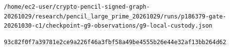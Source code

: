 \documentclass[10pt]{article}
\begin{document}
\texttt{\small /\allowbreak{}h\allowbreak{}o\allowbreak{}m\allowbreak{}e\allowbreak{}/\allowbreak{}e\allowbreak{}c\allowbreak{}2\allowbreak{}-\allowbreak{}u\allowbreak{}s\allowbreak{}e\allowbreak{}r\allowbreak{}/\allowbreak{}c\allowbreak{}r\allowbreak{}y\allowbreak{}p\allowbreak{}t\allowbreak{}o\allowbreak{}-\allowbreak{}p\allowbreak{}e\allowbreak{}n\allowbreak{}c\allowbreak{}i\allowbreak{}l\allowbreak{}-\allowbreak{}s\allowbreak{}i\allowbreak{}g\allowbreak{}n\allowbreak{}e\allowbreak{}d\allowbreak{}-\allowbreak{}g\allowbreak{}r\allowbreak{}a\allowbreak{}p\allowbreak{}h\allowbreak{}-\allowbreak{}2\allowbreak{}0\allowbreak{}2\allowbreak{}6\allowbreak{}1\allowbreak{}0\allowbreak{}2\allowbreak{}9\allowbreak{}/\allowbreak{}r\allowbreak{}e\allowbreak{}s\allowbreak{}e\allowbreak{}a\allowbreak{}r\allowbreak{}c\allowbreak{}h\allowbreak{}/\allowbreak{}p\allowbreak{}e\allowbreak{}n\allowbreak{}c\allowbreak{}i\allowbreak{}l\allowbreak{}\_\allowbreak{}l\allowbreak{}a\allowbreak{}r\allowbreak{}g\allowbreak{}e\allowbreak{}\_\allowbreak{}p\allowbreak{}r\allowbreak{}i\allowbreak{}m\allowbreak{}e\allowbreak{}\_\allowbreak{}2\allowbreak{}0\allowbreak{}2\allowbreak{}6\allowbreak{}1\allowbreak{}0\allowbreak{}2\allowbreak{}9\allowbreak{}/\allowbreak{}r\allowbreak{}u\allowbreak{}n\allowbreak{}s\allowbreak{}/\allowbreak{}p\allowbreak{}1\allowbreak{}8\allowbreak{}6\allowbreak{}3\allowbreak{}7\allowbreak{}9\allowbreak{}-\allowbreak{}g\allowbreak{}a\allowbreak{}t\allowbreak{}e\allowbreak{}-\allowbreak{}2\allowbreak{}0\allowbreak{}2\allowbreak{}6\allowbreak{}1\allowbreak{}0\allowbreak{}3\allowbreak{}0\allowbreak{}-\allowbreak{}c\allowbreak{}1\allowbreak{}/\allowbreak{}c\allowbreak{}h\allowbreak{}e\allowbreak{}c\allowbreak{}k\allowbreak{}p\allowbreak{}o\allowbreak{}i\allowbreak{}n\allowbreak{}t\allowbreak{}-\allowbreak{}g\allowbreak{}9\allowbreak{}-\allowbreak{}o\allowbreak{}b\allowbreak{}s\allowbreak{}e\allowbreak{}r\allowbreak{}v\allowbreak{}a\allowbreak{}t\allowbreak{}i\allowbreak{}o\allowbreak{}n\allowbreak{}s\allowbreak{}/\allowbreak{}g\allowbreak{}9\allowbreak{}-\allowbreak{}l\allowbreak{}o\allowbreak{}c\allowbreak{}a\allowbreak{}l\allowbreak{}-\allowbreak{}c\allowbreak{}u\allowbreak{}s\allowbreak{}t\allowbreak{}o\allowbreak{}d\allowbreak{}y\allowbreak{}.\allowbreak{}j\allowbreak{}s\allowbreak{}o\allowbreak{}n\allowbreak{}}\par\texttt{\small 9\allowbreak{}3\allowbreak{}c\allowbreak{}8\allowbreak{}2\allowbreak{}f\allowbreak{}0\allowbreak{}f\allowbreak{}7\allowbreak{}a\allowbreak{}3\allowbreak{}9\allowbreak{}7\allowbreak{}8\allowbreak{}1\allowbreak{}e\allowbreak{}2\allowbreak{}c\allowbreak{}e\allowbreak{}9\allowbreak{}a\allowbreak{}2\allowbreak{}2\allowbreak{}6\allowbreak{}f\allowbreak{}4\allowbreak{}6\allowbreak{}a\allowbreak{}3\allowbreak{}f\allowbreak{}b\allowbreak{}f\allowbreak{}5\allowbreak{}8\allowbreak{}a\allowbreak{}4\allowbreak{}9\allowbreak{}b\allowbreak{}e\allowbreak{}4\allowbreak{}5\allowbreak{}5\allowbreak{}5\allowbreak{}b\allowbreak{}2\allowbreak{}6\allowbreak{}e\allowbreak{}4\allowbreak{}4\allowbreak{}e\allowbreak{}3\allowbreak{}2\allowbreak{}a\allowbreak{}f\allowbreak{}1\allowbreak{}3\allowbreak{}b\allowbreak{}b\allowbreak{}2\allowbreak{}6\allowbreak{}4\allowbreak{}d\allowbreak{}6\allowbreak{}2\allowbreak{}}\par
\end{document}
